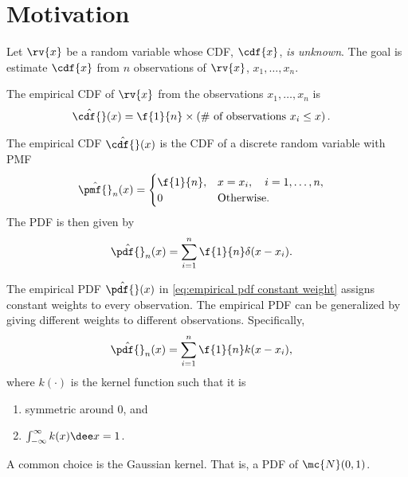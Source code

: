 \section{Motivation}
Let $\rv{x}$ be a random variable whose CDF, $\cdf{x}$, \emph{is unknown}. The goal is estimate $\cdf{x}$ from $n$ observations of $\rv{x}$, $x_{1}, \ldots, x_{n}$.

\begin{mydefinition}
    The empirical CDF of $\rv{x}$ from the observations $x_{1}, \ldots, x_{n}$ is
    \begin{align}
        \hat{\cdf{}}(x) &= \f{1}{n} \times \left( \# \text{ of observations } x_{i} \leq x \right).
    \end{align}
\end{mydefinition}
The empirical CDF $\hat{\cdf{}}(x)$ is the CDF of a discrete random variable with PMF
\begin{align}
    \hat{\pmf{}}_{n}(x) &= 
    \begin{cases}
        \f{1}{n}, & x = x_{i}, \quad i = 1,\ldots, n,\\
        0 & \text{Otherwise}.
    \end{cases}
\end{align}
The PDF is then given by
\begin{align}
    \label{eq:empirical pdf constant weight}
    \hat{\pdf{}}_{n}(x) &= \sum_{i=1}^{n}\f{1}{n}\delta(x-x_{i}).
\end{align}

The empirical PDF $\hat{\pdf{}}(x)$ in \eqref{eq:empirical pdf constant weight} assigns constant weights to every observation. The empirical PDF can be generalized by giving different weights to different observations. Specifically,
\begin{align}
    \hat{\pdf{}}_{n}(x) &= \sum_{i=1}^{n}\f{1}{n}k(x-x_{i}),
\end{align}
where $k(\cdot)$ is the kernel function such that it is
\begin{enumerate}
    \item symmetric around 0, and
    \item $\int_{-\infty}^{\infty}k(x)\dee x = 1$.
\end{enumerate}
A common choice is the Gaussian kernel. That is, a PDF of $\mc{N}(0,1)$.


